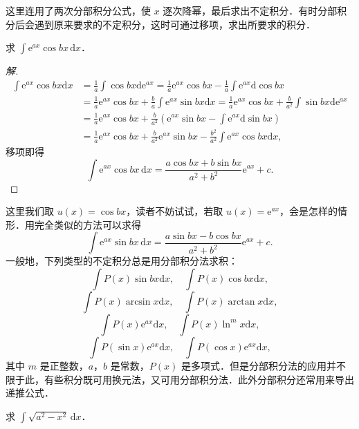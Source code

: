 这里连用了两次分部积分公式，使 $x$ 逐次降幂，最后求出不定积分．有时分部积分后会遇到原来要求的不定积分，这时可通过移项，求出所要求的积分．

\begin{example}\label{ex:6-2-17}
求 $\displaystyle\int\mathrm{e}^{ax}\cos bx\,\mathrm{d}x$．
\end{example}

\begin{proof}[解]
\[
\begin{aligned}
\int\mathrm{e}^{ax}\cos bx\mathrm{d}x
&= \frac{1}{a}\int\cos bx\mathrm{d}\mathrm{e}^{ax}
= \frac{1}{a}\mathrm{e}^{ax}\cos bx-\frac{1}{a}\int\mathrm{e}^{ax}\mathrm{d}\cos bx\\
&= \frac{1}{a}\mathrm{e}^{ax}\cos bx+\frac{b}{a}\int\mathrm{e}^{ax}\sin bx\mathrm{d}x
= \frac{1}{a}\mathrm{e}^{ax}\cos bx+\frac{b}{a^{2}}\int\sin bx\mathrm{d}\mathrm{e}^{ax}\\
&= \frac{1}{a}\mathrm{e}^{ax}\cos bx+\frac{b}{a^{2}}\left(\mathrm{e}^{ax}\sin bx-\int\mathrm{e}^{ax}\mathrm{d}\sin bx\right)\\
&= \frac{1}{a}\mathrm{e}^{ax}\cos bx+\frac{b}{a^{2}}\mathrm{e}^{ax}\sin bx-\frac{b^{2}}{a^{2}}\int\mathrm{e}^{ax}\cos bx\mathrm{d}x,
\end{aligned}
\]
移项即得
\[
\int\mathrm{e}^{ax}\cos bx\,\mathrm{d}x
= \frac{a\cos bx+b\sin bx}{a^{2}+b^{2}}\mathrm{e}^{ax}+c.
\]
\end{proof}

这里我们取 $u(x) = \cos bx$，读者不妨试试，若取 $u(x) = \mathrm{e}^{ax}$，会是怎样的情形．用完全类似的方法可以求得
\[
\int\mathrm{e}^{ax}\sin bx\,\mathrm{d}x
= \frac{a\sin bx-b\cos bx}{a^{2}+b^{2}}\mathrm{e}^{ax}+c.
\]
一般地，下列类型的不定积分总是用分部积分法求积：
\[
\int P(x)\sin bx\mathrm{d}x,\quad \int P(x)\cos bx\mathrm{d}x,
\]
\[
\int P(x)\arcsin x\mathrm{d}x,\quad \int P(x)\arctan x\mathrm{d}x,
\]
\[
\int P(x)\mathrm{e}^{ax}\mathrm{d}x,\quad \int P(x)\ln^{m}x\mathrm{d}x,
\]
\[
\int P(\sin x)\mathrm{e}^{ax}\mathrm{d}x,\quad \int P(\cos x)\mathrm{e}^{ax}\mathrm{d}x,
\]
其中 $m$ 是正整数，$a$，$b$ 是常数，$P(x)$ 是多项式．但是分部积分法的应用并不限于此，有些积分既可用换元法，又可用分部积分法．此外分部积分还常用来导出递推公式．

\begin{example}\label{ex:6-2-18}
求 $\displaystyle\int\sqrt{a^{2}-x^{2}}\,\mathrm{d}x$．
\end{example}

